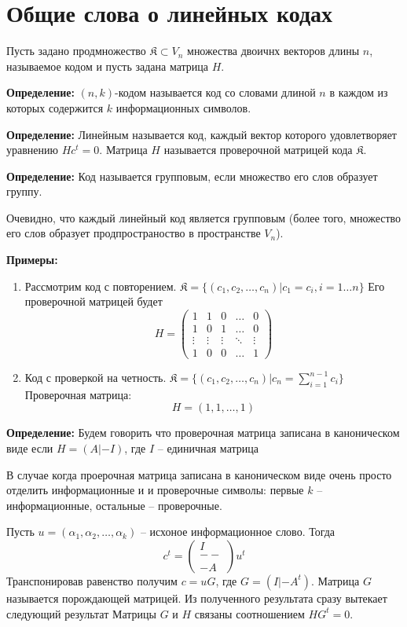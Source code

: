 \documentclass{article}
\newcommand{\DEF}[1] {
    \textbf{Определение: } #1
}
\newcommand{\EXMP} {\textbf{Примеры: }}
\begin{document}
    \section{Общие слова о линейных кодах}

    Пусть задано продмножество $\mathfrak{K} \subset V_n$ множества двоичнх векторов длины $n$, называемое кодом и пусть задана матрица $H$.

    \DEF{$(n, k)$-кодом называется код со словами длиной $n$ в каждом из которых содержится $k$ информационных символов.}

    \DEF{Линейным называется код, каждый вектор которого удовлетворяет уравнению $Hc^t = 0$. Матрица $H$ называется проверочной матрицей 
    кода $\mathfrak{K}$.}

    \DEF{Код называется групповым, если множество его слов образует группу.}

    Очевидно, что каждый линейный код является групповым (более того, множество его слов образует продпространоство в пространстве $V_n$).

    \EXMP 
    \begin{enumerate}
        \item Рассмотрим код с повторением. $\mathfrak{K} = \{ (c_1, c_2, \dots , c_n) | c_1 = c_i, i=1\dots n \}$
            Его проверочной матрицей будет 
            $$
            H = \begin{pmatrix}
                1 & 1 & 0 & \dots & 0 \\
                1 & 0 & 1 & \dots & 0 \\
                \vdots & \vdots & \vdots & \ddots & \vdots\\
                1 & 0 & 0 & \dots & 1 
            \end{pmatrix}
            $$
        \item Код с проверкой на четность. $\mathfrak{K} = \{ (c_1, c_2, \dots , c_n) | c_n = \sum_{i = 1}^{n - 1} c_i \}$
            Проверочная матрица:
            $$
            H = (1, 1, \dots , 1)
            $$
    \end{enumerate}

    \DEF{Будем говорить что проверочная матрица записана в каноническом виде если $H = (A | -I)$, где $I$ -- единичная матрица}

    В случае когда проерочная матрица записана в каноническом виде очень просто отделить информационные и и проверочные символы:
    первые $k$ -- информационные, остальные -- проверочные.

    Пусть $u = (\alpha_1, \alpha_2, \dots ,\alpha_k)$ -- исхоное информационное слово. Тогда 
    $$
        c^t = \begin{pmatrix} I \\ -- \\ -A \end{pmatrix} u^t
    $$
    Транспонировав равенство получим $c = uG$, где $G = (I | -A^t)$. Матрица $G$ называется порождающей матрицей. Из полученного результата сразу вытекает следующий результат
    Матрицы $G$ и $H$ связаны соотношением $HG^t = 0$.
\end{document}
